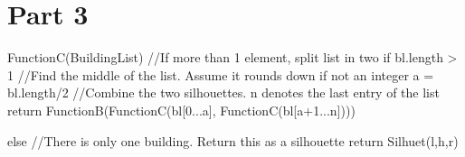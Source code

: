 \documentclass[a4paper,oneside,article,11pt]{memoir}
\begin{document}
\chapter*{Part 3}

\begin{VerbatimTest}
FunctionC(BuildingList)
    //If more than 1 element, split list in two
    if bl.length > 1        
        //Find the middle of the list. Assume it rounds down if not an integer
        a = bl.length/2    
        //Combine the two silhouettes. n denotes the last entry of the list
        return FunctionB(FunctionC(bl[0...a], FunctionC(bl[a+1...n])))
        
    else
        //There is only one building. Return this as a silhouette
        return Silhuet(l,h,r)
\end{VerbatimTest}
\end{document}

